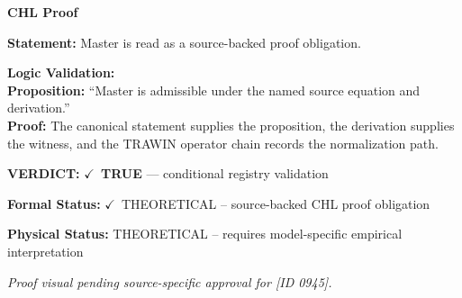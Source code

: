 \vspace{0.45em}
\noindent\textbf{CHL Proof}\par
\textbf{Statement:} Master is read as a source-backed proof obligation.

\textbf{Logic Validation:}\\
\textbf{Proposition:} ``Master is admissible under the named source equation and derivation.''\\
\textbf{Proof:} The canonical statement supplies the proposition, the derivation supplies the witness, and the TRAWIN operator chain records the normalization path.

\textbf{VERDICT:} \ensuremath{\checkmark}\ \textbf{TRUE} --- conditional registry validation

\textbf{Formal Status:} \ensuremath{\checkmark}\ THEORETICAL -- source-backed CHL proof obligation

\textbf{Physical Status:} THEORETICAL -- requires model-specific empirical interpretation
\par\vspace{0.45em}
\par
\vfill
\begingroup\footnotesize\itshape
Proof visual pending source-specific approval for [ID 0945].
\par\endgroup
\vfill
\endgroup
\endgroup
